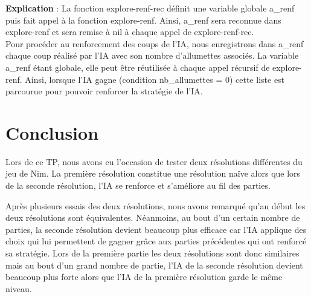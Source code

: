 \documentclass[
]{article}
\begin{document}
\textbf{Explication} : La fonction explore-renf-rec définit une variable
globale a\_renf puis fait appel à la fonction explore-renf. Ainsi,
a\_renf sera reconnue dans explore-renf et sera remise à nil à chaque
appel de explore-renf-rec.\\
Pour procéder au renforcement des coups de l'IA, nous enregistrons dans
a\_renf chaque coup réalisé par l'IA avec son nombre d'allumettes
associés. La variable a\_renf étant globale, elle peut être réutilisée à
chaque appel récursif de explore-renf. Ainsi, lorsque l'IA gagne
(condition nb\_allumettes = 0) cette liste est parcourue pour pouvoir
renforcer la stratégie de l'IA.

\pagebreak

\hypertarget{conclusion}{%
\section{Conclusion}\label{conclusion}}

Lors de ce TP, nous avons eu l'occasion de tester deux résolutions
différentes du jeu de Nim. La première résolution constitue une
résolution naïve alors que lors de la seconde résolution, l'IA se
renforce et s'améliore au fil des parties.

Après plusieurs essais des deux résolutions, nous avons remarqué qu'au
début les deux résolutions sont équivalentes. Néanmoins, au bout d'un
certain nombre de parties, la seconde résolution devient beaucoup plus
efficace car l'IA applique des choix qui lui permettent de gagner grâce
aux parties précédentes qui ont renforcé sa stratégie. Lors de la
première partie les deux résolutions sont donc similaires mais au bout d'un
grand nombre de partie, l'IA de la seconde résolution devient beaucoup
plus forte alors que l'IA de la première résolution garde le même
niveau.
\end{document}

